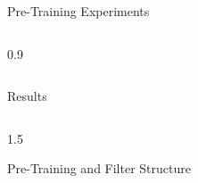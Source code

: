 \documentclass[final]{beamer}
\newlength{\onecolwid}
\newlength{\threecolwid}
\begin{document}
\begin{frame}[t]
\begin{columns}[t]
\begin{column}{\threecolwid}
\begin{alertblock}{Pre-Training Experiments}
\begin{columns}[t, totalwidth=0.9\threecolwid]
\begin{column}{0.9\onecolwid}

	\end{column}
\end{columns}


\end{alertblock}

\begin{alertblock}{Results}

\begin{columns}[t]

	\begin{column}{1.5\onecolwid}

		\begin{block}{Pre-Training and Filter Structure}

			\begin{figure}
			\centering


\end{figure}
\end{block}
\end{column}
\end{columns}
\end{alertblock}
\end{column}
\end{columns}
\end{frame}
\end{document}
